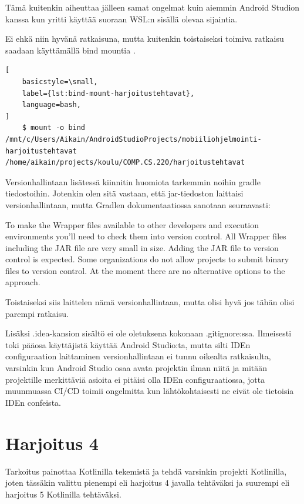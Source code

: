 Tämä kuitenkin aiheuttaa jälleen samat ongelmat kuin aiemmin Android Studion
kanssa kun yritti käyttää suoraan WSL:n sisällä olevaa sijaintia.

Ei ehkä niin hyvänä ratkaisuna, mutta kuitenkin toistaiseksi toimiva ratkaisu
saadaan käyttämällä bind mountia \parencite{BaeldungBindMounts}.

\begin{lstlisting}[
    basicstyle=\small,
    label={lst:bind-mount-harjoitustehtavat},
    language=bash,
]
    $ mount -o bind /mnt/c/Users/Aikain/AndroidStudioProjects/mobiiliohjelmointi-harjoitustehtavat /home/aikain/projects/koulu/COMP.CS.220/harjoitustehtavat
\end{lstlisting}

Versionhallintaan lisätessä kiinnitin huomiota tarkemmin noihin gradle
tiedostoihin. Jotenkin olen sitä vastaan, että jar-tiedoston laittaisi
versionhallintaan, mutta Gradlen dokumentaatiossa
\parencite{GradleDocsGradleWrapper} sanotaan seuraavasti:

\begin{displayquote}
To make the Wrapper files available to other developers and execution
environments you’ll need to check them into version control. All Wrapper files
including the JAR file are very small in size. Adding the JAR file to version
control is expected. Some organizations do not allow projects to submit binary
files to version control. At the moment there are no alternative options to the
approach.
\end{displayquote}

Toistaiseksi siis laittelen nämä versionhallintaan, mutta olisi hyvä jos tähän
olisi parempi ratkaisu.

Lisäksi .idea-kansion sisältö ei ole oletuksena kokonaan .gitignore:ssa.
Ilmeisesti toki pääosa käyttäjistä käyttää Android Studio:ta, mutta silti IDEn
configuraation laittaminen versionhallintaan ei tunnu oikealta ratkaisulta,
varsinkin kun Android Studio osaa avata projektin ilman niitä ja mitään
projektille merkittäviä asioita ei pitäisi olla IDEn configuraatiossa, jotta
muunmuassa CI/CD toimii ongelmitta kun lähtökohtaisesti ne eivät ole tietoisia
IDEn confeista.

\section{Harjoitus 4}

Tarkoitus painottaa Kotlinilla tekemistä ja tehdä varsinkin projekti
Kotlinilla, joten tässäkin valittu pienempi eli harjoitus 4 javalla tehtäväksi
ja suurempi eli harjoitus 5 Kotlinilla tehtäväksi.

